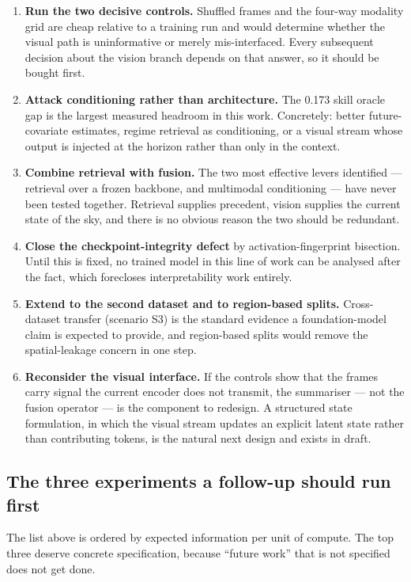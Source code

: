 \begin{enumerate}
  \item \textbf{Run the two decisive controls.} Shuffled frames and the four-way modality
    grid are cheap relative to a training run and would determine whether the visual path is
    uninformative or merely mis-interfaced. Every subsequent decision about the vision branch
    depends on that answer, so it should be bought first.
  \item \textbf{Attack conditioning rather than architecture.} The 0.173 skill oracle gap is
    the largest measured headroom in this work. Concretely: better future-covariate
    estimates, regime retrieval as conditioning, or a visual stream whose output is injected
    at the horizon rather than only in the context.
  \item \textbf{Combine retrieval with fusion.} The two most effective levers identified ---
    retrieval over a frozen backbone, and multimodal conditioning --- have never been tested
    together. Retrieval supplies precedent, vision supplies the current state of the sky, and
    there is no obvious reason the two should be redundant.
  \item \textbf{Close the checkpoint-integrity defect} by activation-fingerprint bisection.
    Until this is fixed, no trained model in this line of work can be analysed after the fact,
    which forecloses interpretability work entirely.
  \item \textbf{Extend to the second dataset and to region-based splits.} Cross-dataset
    transfer (scenario S3) is the standard evidence a foundation-model claim is expected to
    provide, and region-based splits would remove the spatial-leakage concern in one step.
  \item \textbf{Reconsider the visual interface.} If the controls show that the frames carry
    signal the current encoder does not transmit, the summariser --- not the fusion operator
    --- is the component to redesign. A structured state formulation, in which the visual
    stream updates an explicit latent state rather than contributing tokens, is the natural
    next design and exists in draft.
\end{enumerate}

\subsection{The three experiments a follow-up should run first}

The list above is ordered by expected information per unit of compute. The top three deserve
concrete specification, because ``future work'' that is not specified does not get done.


